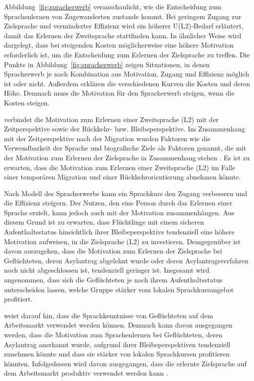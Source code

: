 Abbildung~\ref{fig:spracherwerb} veranschaulicht, wie die Entscheidung zum Sprachenlernen von Zugewanderten zustande kommt. Bei geringem Zugang zur Zielsprache und verminderter Effizienz wird ein höherer U(L2)-Bedarf erläutert, damit das Erlernen der Zweitsprache stattfinden kann. In ähnlicher Weise wird dargelegt, dass bei steigenden Kosten möglicherweise eine höhere Motivation erforderlich ist, um die Entscheidung zum Erlernen der Zielsprache zu treffen. Die Punkte in Abbildung~\ref{fig:spracherwerb} zeigen Situationen, in denen Spracherwerb je nach Kombination aus Motivation, Zugang und Effizienz möglich ist oder nicht. Außerdem erklären die verschiedenen Kurven die Kosten und deren Höhe. Demnach muss die Motivation für den Spracherwerb steigen, wenn die Kosten steigen.

\textcite{Esser:2006} verbindet die Motivation zum Erlernen einer Zweitsprache (L2) mit der Zeitperspektive sowie der Rückkehr- bzw. Bleibeperspektive. Im Zusammenhang mit der Zeitperspektive nach der Migration wurden Faktoren wie die Verwendbarkeit der Sprache und biografische Ziele als Faktoren genannt, die mit der Motivation zum Erlernen der Zielsprache in Zusammenhang stehen \parencite[82]{Esser:2006}. Es ist zu erwarten, dass die Motivation zum Erlernen einer Zweitsprache (L2) im Falle einer temporären Migration und einer Rückkehrorientierung abnehmen könnte.

Nach \textcite{Esser:2006} Modell des Spracherwerbs kann ein Sprachkurs den Zugang verbessern und die Effizienz steigern. Der Nutzen, den eine Person durch das Erlernen einer Sprache erzielt, kann jedoch auch mit der Motivation zusammenhängen. Aus diesem Grund ist zu erwarten, dass Flüchtlinge mit einem sicheren Aufenthaltsstatus hinsichtlich ihrer Bleibeperspektive tendenziell eine höhere Motivation aufweisen, in die Zielsprache (L2) zu investieren. Demgegenüber ist davon auszugehen, dass die Motivation zum Erlernen der Zielsprache bei Geflüchteten, deren Asylantrag abgelehnt wurde oder deren Asylantragsverfahren noch nicht abgeschlossen ist, tendenziell geringer ist. Insgesamt wird angenommen, dass sich die Geflüchteten je nach ihrem Aufenthaltsstatus unterscheiden lassen, welche Gruppe stärker vom lokalen Sprachkursangebot profitiert.

\textcite{Esser:2006} weist darauf hin, dass die Sprachkenntnisse von Geflüchteten auf dem Arbeitsmarkt verwendet werden können. Demnach kann davon ausgegangen werden, dass die Motivation zum Sprachenlernen bei Geflüchteten, deren Asylantrag anerkannt wurde, aufgrund ihrer Bleibeperspektiven tendenziell zunehmen könnte und dass sie stärker von lokalen Sprachkursen profitieren könnten. Infolgedessen wird davon ausgegangen, dass die erlernte Zielsprache auf dem Arbeitsmarkt produktiv verwendet werden kann \parencite[68--70]{Esser:2006}.
